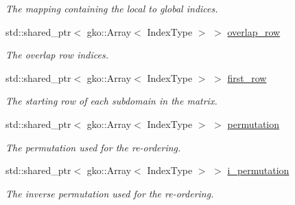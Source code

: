 \begin{DoxyCompactItemize}
\begin{DoxyCompactList}\small\item\em The mapping containing the local to global indices. \end{DoxyCompactList}\item 
\mbox{\label{structSchwarzWrappers_1_1Metadata_ad49bbfa09a5d14231fcd10f0f4c6e278}} 
std\+::shared\+\_\+ptr$<$ gko\+::\+Array$<$ Index\+Type $>$ $>$ \hyperlink{structSchwarzWrappers_1_1Metadata_ad49bbfa09a5d14231fcd10f0f4c6e278}{overlap\+\_\+row}
\begin{DoxyCompactList}\small\item\em The overlap row indices. \end{DoxyCompactList}\item 
\mbox{\label{structSchwarzWrappers_1_1Metadata_a492432957e6db6cb4a5aa952c50b5e45}} 
std\+::shared\+\_\+ptr$<$ gko\+::\+Array$<$ Index\+Type $>$ $>$ \hyperlink{structSchwarzWrappers_1_1Metadata_a492432957e6db6cb4a5aa952c50b5e45}{first\+\_\+row}
\begin{DoxyCompactList}\small\item\em The starting row of each subdomain in the matrix. \end{DoxyCompactList}\item 
\mbox{\label{structSchwarzWrappers_1_1Metadata_a4d7e14a2b12922798de1eed07038fabb}} 
std\+::shared\+\_\+ptr$<$ gko\+::\+Array$<$ Index\+Type $>$ $>$ \hyperlink{structSchwarzWrappers_1_1Metadata_a4d7e14a2b12922798de1eed07038fabb}{permutation}
\begin{DoxyCompactList}\small\item\em The permutation used for the re-\/ordering. \end{DoxyCompactList}\item 
\mbox{\label{structSchwarzWrappers_1_1Metadata_a24ac4e79378f3913bc0ec332cff1a28c}} 
std\+::shared\+\_\+ptr$<$ gko\+::\+Array$<$ Index\+Type $>$ $>$ \hyperlink{structSchwarzWrappers_1_1Metadata_a24ac4e79378f3913bc0ec332cff1a28c}{i\+\_\+permutation}
\begin{DoxyCompactList}\small\item\em The inverse permutation used for the re-\/ordering. \end{DoxyCompactList}\end{DoxyCompactItemize}


